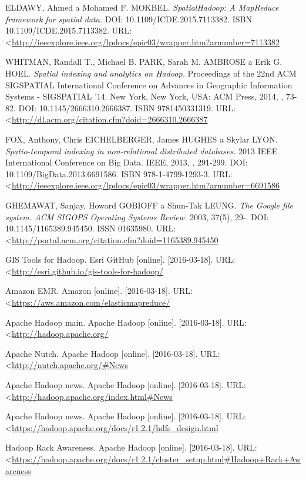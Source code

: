 \documentclass[a4paper,12pt,oneside]{report}
\begin{document}
\begin{thebibliography}{99}
ELDAWY, Ahmed a Mohamed F. MOKBEL. \textit{SpatialHadoop: A MapReduce framework for spatial data.} DOI: 10.1109/ICDE.2015.7113382. ISBN 10.1109/ICDE.2015.7113382. URL:  \textless\url{http://ieeexplore.ieee.org/lpdocs/epic03/wrapper.htm?arnumber=7113382}

WHITMAN, Randall T., Michael B. PARK, Sarah M. AMBROSE a Erik G. HOEL. \textit{Spatial indexing and analytics on Hadoop.} Proceedings of the 22nd ACM SIGSPATIAL International Conference on Advances in Geographic Information Systems - SIGSPATIAL '14. New York, New York, USA: ACM Press, 2014, , 73-82. DOI: 10.1145/2666310.2666387. ISBN 9781450331319. URL:  \textless\url{http://dl.acm.org/citation.cfm?doid=2666310.2666387}

FOX, Anthony, Chris EICHELBERGER, James HUGHES a Skylar LYON. \textit{Spatio-temporal indexing in non-relational distributed databases.} 2013 IEEE International Conference on Big Data. IEEE, 2013, , 291-299. DOI: 10.1109/BigData.2013.6691586. ISBN 978-1-4799-1293-3. URL:  \textless\url{http://ieeexplore.ieee.org/lpdocs/epic03/wrapper.htm?arnumber=6691586}

GHEMAWAT, Sanjay, Howard GOBIOFF a Shun-Tak LEUNG. \textit{The Google file system. ACM SIGOPS Operating Systems Review.} 2003, 37(5), 29-. DOI: 10.1145/1165389.945450. ISSN 01635980.  URL:  \textless\url{http://portal.acm.org/citation.cfm?doid=1165389.945450}







GIS Tools for Hadoop. Esri GitHub [online]. [2016-03-18]. URL:  \textless\url{http://esri.github.io/gis-tools-for-hadoop/}

Amazon EMR. Amazon [online]. [2016-03-18]. 
URL: \textless\url{https://aws.amazon.com/elasticmapreduce/}

Apache Hadoop main. Apache Hadoop [online]. [2016-03-18]. 
URL: \textless\url{http://hadoop.apache.org/}

Apache Nutch. Apache Hadoop [online]. [2016-03-18]. 
URL: \textless\url{http://nutch.apache.org/#News
}

Apache Hadoop news. Apache Hadoop [online]. [2016-03-18]. 
URL: \textless\url{http://hadoop.apache.org/index.html#News}


Apache Hadoop news. Apache Hadoop [online]. [2016-03-18]. 
URL: \textless\url{https://hadoop.apache.org/docs/r1.2.1/hdfs_design.html}


Hadoop Rack Awareness. Apache Hadoop [online]. [2016-03-18]. 
URL: \textless\url{https://hadoop.apache.org/docs/r1.2.1/cluster_setup.html#Hadoop+Rack+Awareness}

\end{thebibliography}
\end{document}
